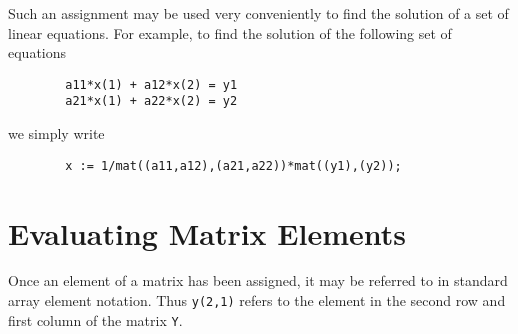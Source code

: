 Such an assignment may be used very conveniently to find the solution of a
set of linear equations. For example, to find the solution of the
following set of equations
\begin{verbatim}
        a11*x(1) + a12*x(2) = y1
        a21*x(1) + a22*x(2) = y2
\end{verbatim}
we simply write
\begin{verbatim}
        x := 1/mat((a11,a12),(a21,a22))*mat((y1),(y2));
\end{verbatim}

\section{Evaluating Matrix Elements}

Once an element of a matrix has been assigned, it may be referred to in
standard array element notation.  Thus \texttt{y(2,1)} refers to the element
in the second row and first column of the matrix \texttt{Y}.

